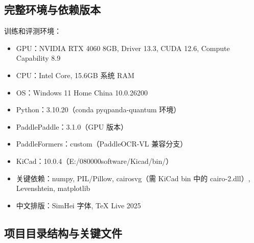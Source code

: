 \subsection{完整环境与依赖版本}

训练和评测环境：

\begin{itemize}[nosep]
    \item GPU：NVIDIA RTX 4060 8GB, Driver 13.3, CUDA 12.6, Compute Capability 8.9
    \item CPU：Intel Core, 15.6GB 系统 RAM
    \item OS：Windows 11 Home China 10.0.26200
    \item Python：3.10.20（conda pyqpanda-quantum 环境）
    \item PaddlePaddle：3.1.0（GPU 版本）
    \item PaddleFormers：custom（PaddleOCR-VL 兼容分支）
    \item KiCad：10.0.4（E:/080000software/Kicad/bin/）
    \item 关键依赖：numpy, PIL/Pillow, cairosvg（需 KiCad bin 中的 cairo-2.dll）, Levenshtein, matplotlib
    \item 中文排版：SimHei 字体, TeX Live 2025
\end{itemize}

\subsection{项目目录结构与关键文件}

